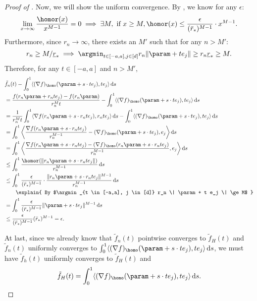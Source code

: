 \begin{proof}[Proof of ]
Now, we will show the uniform convergence. By , we know for any $\epsilon$:
\[
\lim_{x\to \infty} \frac{\homor(x)}{ x^{M-1}} =0 \implies  \exists M, \text{ if } x \ge M, \homor(x) \le \frac{\epsilon}{(\bar r_*)^{M-1}} \cdot x^{M-1}. 
\]
Furthermore, since $r_n \to \infty$, there exists an $M'$ such that for any $n>M'$: 
\[
r_n \ge M/\underline{r}_* \implies \argmin_{t \in [-a,a], j \in [d]} r_n \| \param + t e_j \| \ge r_n  \underline{r}_* \ge M.
\]
Therefore, for any $t\in [-a, a]$ and $n>M'$,
\begin{align*}
&\tilde f_n(t)  - \int_0^1  \langle (\nabla f)_\homo (\param + s \cdot t e_j), t e_j  \rangle\, \mathrm{d}s \\ 
&= 
\frac{f(r_n\param + r_n t e_j) - f(r_n\param)}{r_n^M t}  - \int_0^1  \langle (\nabla f)_\homo (\param + s \cdot t e_j), t e_j  \rangle\, \mathrm{d}s
\\ 
&= \frac{1}{r_n^M t}  \int_{0}^1 \langle \nabla  f(r_n\param + s\cdot  r_n t e_j),  r_n t e_j \rangle \, \mathrm{d}s  - \int_0^1  \langle (\nabla f)_\homo (\param + s \cdot t e_j), t e_j  \rangle\, \mathrm{d}s
\\ 
&=   \int_{0}^1 \bigg\langle   \frac{\nabla f(r_n\param + s\cdot  r_n t e_j)}{r_n^{M-1}} - (\nabla f)_\homo (\param + s \cdot t e_j),   e_j \bigg\rangle \, \mathrm{d}s
\\ 
&=   \int_{0}^1 \bigg\langle  \frac{\nabla  f(r_n\param + s\cdot  r_n t e_j)-  (\nabla f)_\homo (r_n\param + s \cdot r_n t e_j)}{r_n^{M-1}} ,   e_j \bigg\rangle \, \mathrm{d}s
\\ 
&\le   \int_{0}^1   \frac{ \homor ( \|r_n\param + s\cdot  r_n t e_j\|)}{r_n^{M-1}}  \, \mathrm{d}s
\\
&\le \int_{0}^1   \frac{\epsilon}{(\bar r_*)^{M-1}} \cdot \frac{  \|r_n\param + s\cdot  r_n t e_j\|^{M-1}}{r_n^{M-1}}  \, \mathrm{d}s 
\\ 
&\qquad  \explain{ By $\argmin_{t \in [-a,a], j \in [d]} r_n \| \param + t e_j \|  \ge M$ }
\\
&= \int_{0}^1    \frac{\epsilon}{(\bar r_*)^{M-1}}  \|\param + s\cdot   t e_j\|^{M-1}  \, \mathrm{d}s
\\
&\le \frac{\epsilon}{(\bar r_*)^{M-1}} (\bar r_*)^{M-1} = \epsilon.
\end{align*}

At last, since we already know that $\tilde f_n(t)$ pointwise converges to $\tilde f_H(t)$ and $\tilde f_n(t)$ uniformly converges to $\int_0^1  \langle (\nabla f)_\homo (\param + s \cdot t e_j), t e_j  \rangle\, \mathrm{d}s$, we must have $\tilde f_h(t)$ uniformly converges to $\tilde f_H(t)$ and 
\[
\tilde f_H(t) = \int_0^1  \langle (\nabla f)_\homo (\param + s \cdot t e_j), t e_j  \rangle\, \mathrm{d}s. 
\]


\end{proof}
